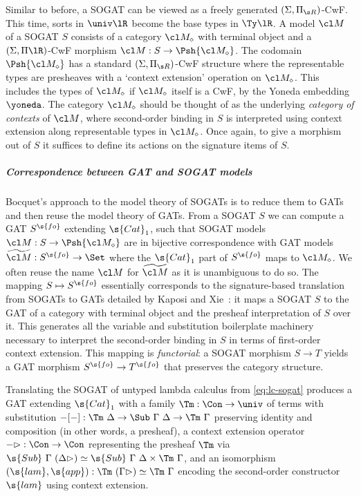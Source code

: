 Similar to before, a SOGAT can be viewed as a freely generated $(\Sigma, \Pi_{\s
R})$-CwF. This time, sorts in $\univ\lR$ become the base types in $\Ty\lR$. A
model\label{def:sogat-model} $\cl M$ of a SOGAT $S$ consists of a category $\cl
M_\diamond$ with terminal object and a $(\Sigma, \Pi\lR)$-CwF morphism $\cl M :
S \to \Psh{\cl M_\diamond}$. The codomain $\Psh{\cl M_\diamond}$ has a standard
$(\Sigma, \Pi_{\s R})$-CwF structure where the representable types are presheaves
with a `context extension' operation on $\cl M_\diamond$. This includes the types of
$\cl M_{\diamond}$ if $\cl M_{\diamond}$ itself is a CwF, by the Yoneda embedding $\yoneda$. The category $\cl M_\diamond$
should be thought of as the underlying \emph{category of contexts} of $\cl M$, where
second-order binding in $S$ is interpreted using context extension along
representable types in $\cl M_\diamond$. Once again, to give a morphism out of $S$
it suffices to define its actions on the signature items of $S$.

\subparagraph{Correspondence between GAT and SOGAT models}

Bocquet's approach to the model theory of SOGATs is to reduce them to GATs and
then reuse the model theory of GATs. From a SOGAT $S$ we can compute a GAT
$S^{\s{fo}}$ extending $\s{Cat}_1$, such that SOGAT models $\cl M : S \to \Psh
{\cl M_{\diamond}}$ are in bijective correspondence with GAT models
$\widetilde{\cl M} : S^\s{fo} \to \Set$ where the $\s{Cat}_1$ part of $S^\s{fo}$
maps to $\cl M_{\diamond}$. We often reuse the name $\cl M$ for $\widetilde{\cl
M}$ as it is unambiguous to do so. The mapping $S \mapsto S^{\s{fo}}$
essentially corresponds to the signature-based translation from SOGATs to GATs
detailed by Kaposi and Xie~\cite{Kaposi2024-db}: it maps a SOGAT $S$ to the GAT
of a category with terminal object and the presheaf interpretation of $S$ over
it. This generates all the variable and substitution boilerplate machinery
necessary to interpret the second-order binding in $S$ in terms of first-order
context extension. This mapping is \emph{functorial}: a SOGAT morphism $S \to T$
yields a GAT morphism $S^{\s{fo}} \to T^{\s{fo}}$ that preserves the category
structure.

\begin{example}\label{ex:lc-fo} Translating the SOGAT of untyped lambda calculus
from \cref{eq:lc-sogat} produces a GAT extending $\s{Cat}_1$ with a family $\Tm
: \Con \to \univ$ of terms with substitution $-[-] : \Tm\ \Delta \to \Sub\
\Gamma\ \Delta \to \Tm\ \Gamma$ preserving identity and composition (in other
words, a presheaf), a context extension operator $-\rhd : \Con \to \Con$
representing the presheaf $\Tm$ via $\s{Sub}\ \Gamma\ (\Delta \rhd) \simeq
\s{Sub}\ \Gamma\ \Delta \times \Tm\ \Gamma$, and an isomorphism $(\s{lam},
\s{app}) : \Tm\ (\Gamma \rhd) \simeq \Tm\ \Gamma$ encoding the second-order
constructor $\s{lam}$ using context extension.
\end{example}

